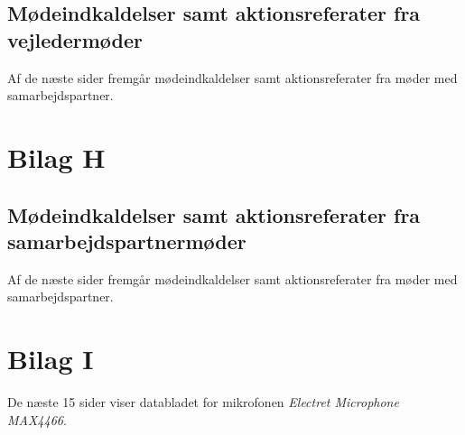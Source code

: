 \subsection{Mødeindkaldelser samt aktionsreferater fra vejledermøder}
Af de næste sider fremgår mødeindkaldelser samt aktionsreferater fra møder med samarbejdspartner. 


\newpage
\section{Bilag H}
\subsection{Mødeindkaldelser samt aktionsreferater fra samarbejdspartnermøder}
Af de næste sider fremgår mødeindkaldelser samt aktionsreferater fra møder med samarbejdspartner. 


\newpage
\section{Bilag I}
De næste 15 sider viser databladet for mikrofonen \textit{Electret Microphone MAX4466}. 



 